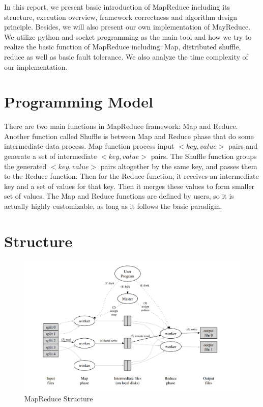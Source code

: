 \documentclass{article}
\begin{document}
In this report, we present basic introduction of MapReduce including its structure, execution overview, framework correctness and algorithm design principle. Besides, we 
will also present our own implementation of MayReduce. We utilize python and socket programming as the main tool and how we try to realize the basic function of MapReduce including: Map, distributed shuffle, reduce as well as basic fault tolerance.
We also analyze the time complexity of our implementation.


\section{Programming Model \cite{dean2008mapreduce}}
There are two main functions in MapReduce framework: Map
and Reduce. Another function called Shuffle is between Map and Reduce phase that do some intermediate data process.
Map function  process input $<key, value>$ pairs and generate a set
of intermediate $<key, value>$ pairs. The Shuffle function groups the generated
$<key, value>$ pairs altogether by the same key, and passes them to the Reduce
function. Then for the Reduce function, it receives an intermediate key and a
set of values for that key. Then it merges these values to form smaller set of
values. The Map and Reduce functions are defined
by users, so it is actually highly customizable, as long as it follows the basic
paradigm.
\section{Structure}
\begin{figure}
      \centering
      \includegraphics[scale = 0.4]{structure.png}
      \caption{MapReduce Structure \cite{dean2008mapreduce}}
\end{figure}
\end{document}
